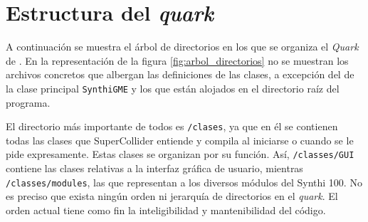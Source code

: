  \section[Estructura de \appName]{Estructura del \textit{quark} \appName {}}

A continuación se muestra el árbol de directorios en los que se organiza el \textit{Quark} de \appName. En la representación de la figura \ref{fig:arbol_directorios} no se muestran los archivos concretos que albergan las definiciones de las clases, a excepción del de la clase principal \texttt{SynthiGME} y los que están alojados en el directorio raíz del programa. 

El directorio más importante de todos es \texttt{/clases}, ya que en él se contienen todas las clases que SuperCollider entiende y compila al iniciarse o cuando se le pide expresamente. Estas clases se organizan por su función. Así, \texttt{/classes/GUI} contiene las clases relativas a la interfaz gráfica de usuario, mientras \texttt{/classes/modules}, las que representan a los diversos módulos del Synthi 100. No es preciso que exista ningún orden ni jerarquía de directorios en el \textit{quark}. El orden actual tiene como fin la inteligibilidad y mantenibilidad del código.


